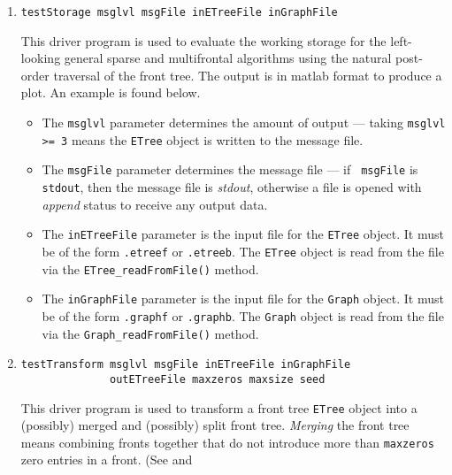 \begin{enumerate}
\begin{figure}[htbp]
\end{figure}
\item
\begin{verbatim}
testStorage msglvl msgFile inETreeFile inGraphFile 
\end{verbatim}
This driver program is used to evaluate the working storage for the
left-looking general sparse and multifrontal algorithms using the
natural post-order traversal of the front tree.
The output is in matlab format to produce a plot.
An example is found below.
\begin{center}
\end{center}
\par
\begin{itemize}
\item
The {\tt msglvl} parameter determines the amount of output ---
taking {\tt msglvl >= 3} means the {\tt ETree} object is written
to the message file.
\item
The {\tt msgFile} parameter determines the message file --- if {\tt
msgFile} is {\tt stdout}, then the message file is {\it stdout},
otherwise a file is opened with {\it append} status to receive any
output data.
\item
The {\tt inETreeFile} parameter is the input file for the {\tt ETree}
object. It must be of the form {\tt *.etreef} or {\tt *.etreeb}.
The {\tt ETree} object is read from the file via the
{\tt ETree\_readFromFile()} method.
\item
The {\tt inGraphFile} parameter is the input file for the {\tt Graph}
object. It must be of the form {\tt *.graphf} or {\tt *.graphb}.
The {\tt Graph} object is read from the file via the
{\tt Graph\_readFromFile()} method.
\end{itemize}
\item
\begin{verbatim}
testTransform msglvl msgFile inETreeFile inGraphFile 
              outETreeFile maxzeros maxsize seed
\end{verbatim}
This driver program is used to transform a front tree {\tt ETree}
object into a (possibly) merged and (possibly) split front tree.
{\it Merging} the front tree means combining fronts together
that do not introduce more than {\tt maxzeros} zero entries in a
front. (See \cite{ash89-relaxed} and \cite{duf83-multifrontal}

\end{enumerate}
